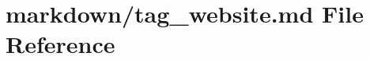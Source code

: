 \hypertarget{tag__website_8md}{}\section{markdown/tag\+\_\+website.md File Reference}
\label{tag__website_8md}
